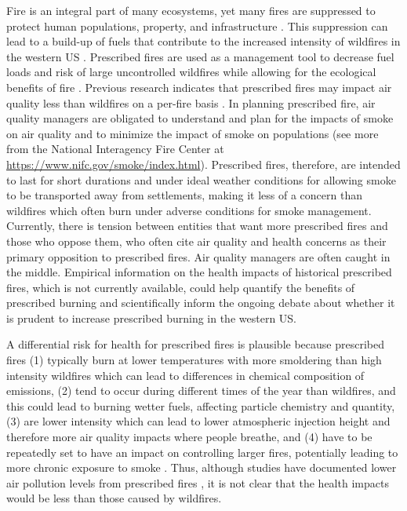 \documentclass[authoryear]{elsarticle}
\begin{document}
Fire is an integral part of many ecosystems, yet many fires are suppressed to protect human populations, property, and infrastructure \citep{Bowman2009}. This suppression can lead to a build-up of fuels that contribute to the increased intensity of wildfires in the western US \citep{Schoennagel2017}. Prescribed fires are used as a management tool to decrease fuel loads and risk of large uncontrolled wildfires while allowing for the ecological benefits of fire \citep{Schoennagel2017}. Previous research indicates that prescribed fires may impact air quality less than wildfires on a per-fire basis \citep{Liu2017}. In planning prescribed fire, air quality managers are obligated to understand and plan for the impacts of smoke on air quality and to minimize the impact of smoke on populations (see more from the National Interagency Fire Center at \url{https://www.nifc.gov/smoke/index.html}). Prescribed fires, therefore, are intended to last for short durations and under ideal weather conditions for allowing smoke to be transported away from settlements, making it less of a concern than wildfires which often burn under adverse conditions for smoke management. Currently, there is tension between entities that want more prescribed fires and those who oppose them, who often cite air quality and health concerns as their primary opposition to prescribed fires. Air quality managers are often caught in the middle. Empirical information on the health impacts of historical prescribed fires, which is not currently available, could help quantify the benefits of prescribed burning and scientifically inform the ongoing debate about whether it is prudent to increase prescribed burning in the western US.

A differential risk for health for prescribed fires is plausible because prescribed fires 
(1) typically burn at lower temperatures with more smoldering than high intensity wildfires which can lead to differences in chemical composition of emissions, 
(2) tend to occur during different times of the year than wildfires, and this could lead to burning wetter fuels, affecting particle chemistry and quantity, %
(3) are lower intensity which can lead to lower atmospheric injection height and therefore more air quality impacts where people breathe, and %
(4) have to be repeatedly set to have an impact on controlling larger fires, 
potentially leading to more chronic exposure to smoke %
\citep{WilliamsonTransdisciplinary2016,Torvela2014}. %
Thus, although studies have documented lower air pollution levels from prescribed fires \citep{Liu2017}, it is not clear that the health impacts would be less than those caused by wildfires. 
\end{document}
